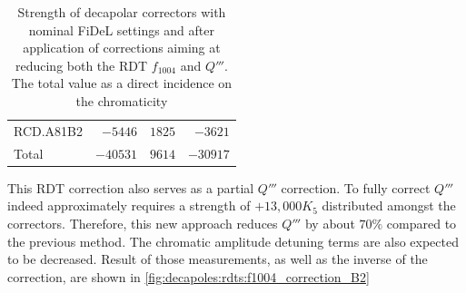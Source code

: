 \begin{table}[!htb]
\begin{tabular}{lrrr}
    \hspace{2mm}RCD.A81B2 &$-5446$ & $1825 $ &  $-3621 $\\
    \hspace{2mm}Total     &$-40531$& $9614 $ &  $-30917$      \\
    \bottomrule
    \end{tabular}
    \caption{Strength of decapolar correctors with nominal FiDeL settings and after application of
    corrections aiming at reducing both the RDT $f_{1004}$ and $Q'''$. The total value as a direct
    incidence on the chromaticity}
    \label{tab:decapoles:rdts:correction_f1004_k5}
\end{table}

This RDT correction also serves as a partial $Q'''$ correction. To fully correct $Q'''$ indeed
approximately requires a strength of $+13,000 K_5$ distributed amongst the correctors. Therefore,
this new approach reduces $Q'''$ by about $70\%$ compared to the previous method. The chromatic
amplitude detuning terms are also expected to be decreased.
Result of those measurements, as well as the inverse of the correction, are shown in 
\cref{fig:decapoles:rdts:f1004_correction_B2}

